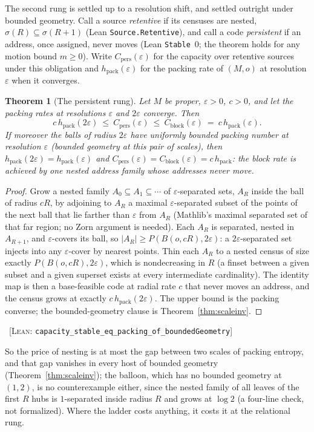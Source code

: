 \documentclass[11pt,reqno]{amsart}
\theoremstyle{plain}
\newtheorem{theorem}{Theorem}[section]
\theoremstyle{definition}
\newcommand{\hpack}{h_{\mathrm{pack}}}
\newcommand{\Cblock}{C_{\mathrm{block}}}
\newcommand{\eps}{\varepsilon}
\newcommand{\cert}[1]{{\footnotesize\ [\textsc{Lean}: \texttt{#1}]}}
\begin{document}
The second rung is settled up to a resolution shift, and settled outright under bounded geometry. Call a source \emph{retentive} if its censuses are nested, $\sigma(R)\subseteq\sigma(R{+}1)$ (Lean \texttt{Source.Retentive}), and call a code \emph{persistent} if an address, once assigned, never moves (Lean \texttt{Stable}~$0$; the theorem holds for any motion bound $m\ge0$). Write $C_{\mathrm{pers}}(\eps)$ for the capacity over retentive sources under this obligation and $\hpack(\eps)$ for the packing rate of $(M,o)$ at resolution $\eps$ when it converges.

\begin{theorem}[The persistent rung]\label{thm:persistent}
Let $M$ be proper, $\eps>0$, $c>0$, and let the packing rates at resolutions $\eps$ and $2\eps$ converge. Then
\[
c\,\hpack(2\eps)\ \le\ C_{\mathrm{pers}}(\eps)\ \le\ \Cblock(\eps)\ =\ c\,\hpack(\eps).
\]
If moreover the balls of radius $2\eps$ have uniformly bounded packing number at resolution $\eps$ (bounded geometry at this pair of scales), then $\hpack(2\eps)=\hpack(\eps)$ and $C_{\mathrm{pers}}(\eps)=\Cblock(\eps)=c\,\hpack$: the block rate is achieved by one nested address family whose addresses never move.
\end{theorem}

\begin{proof}
Grow a nested family $A_0\subseteq A_1\subseteq\cdots$ of $\eps$-separated sets, $A_R$ inside the ball of radius $cR$, by adjoining to $A_R$ a maximal $\eps$-separated subset of the points of the next ball that lie farther than $\eps$ from $A_R$ (Mathlib's maximal separated set of that far region; no Zorn argument is needed). Each $A_R$ is separated, nested in $A_{R+1}$, and $\eps$-covers its ball, so $|A_R|\ge P(B(o,cR),2\eps)$: a $2\eps$-separated set injects into any $\eps$-cover by nearest points. Thin each $A_R$ to a nested census of size exactly $P(B(o,cR),2\eps)$, which is nondecreasing in $R$ (a finset between a given subset and a given superset exists at every intermediate cardinality). The identity map is then a base-feasible code at radial rate $c$ that never moves an address, and the census grows at exactly $c\,\hpack(2\eps)$. The upper bound is the packing converse; the bounded-geometry clause is Theorem~\ref{thm:scaleinv}.
\end{proof}\cert{capacity\_\allowbreak{}stable\_\allowbreak{}eq\_\allowbreak{}packing\_\allowbreak{}of\_\allowbreak{}boundedGeometry}

So the price of nesting is at most the gap between two scales of packing entropy, and that gap vanishes in every host of bounded geometry (Theorem~\ref{thm:scaleinv}); the balloon, which has no bounded geometry at $(1,2)$, is no counterexample either, since the nested family of all leaves of the first $R$ hubs is $1$-separated inside radius $R$ and grows at $\log2$ (a four-line check, not formalized). Where the ladder costs anything, it costs it at the relational rung.
\end{document}
